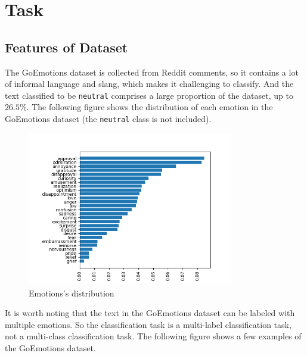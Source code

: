 \documentclass{article}
\begin{document}
\section{Task}

\subsection{Features of Dataset}

The GoEmotions dataset is collected from Reddit comments, so it contains a lot of informal language and slang, which makes it challenging to classify. And the text classified to be \texttt{neutral} comprises a large proportion of the dataset, up to $26.5\%$. The following figure shows the distribution of each emotion in the GoEmotions dataset (the \texttt{neutral} class is not included).

\begin{figure}[H]
  \centering
  \includegraphics[width=0.8\textwidth]{img2.png}
  \caption{Emotions's distribution}
  \label{fig1:label}
\end{figure}

It is worth noting that the text in the GoEmotions dataset can be labeled with multiple emotions. So the classification task is a multi-label classification task, not a multi-class classification task. The following figure shows a few examples of the GoEmotions dataset.
\end{document}
